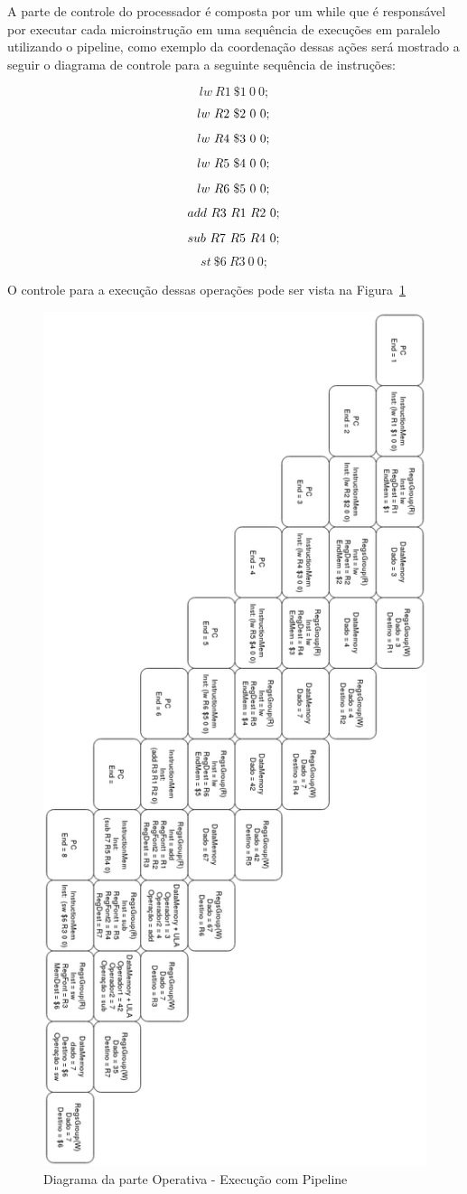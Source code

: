 \documentclass[12pt]{article}
\begin{document}
A parte de controle do processador é composta por um while que é responsável por executar cada microinstrução em uma sequência de execuções em paralelo utilizando o pipeline, como exemplo da coordenação dessas ações será mostrado a seguir o diagrama de controle para a seguinte sequência de instruções:

$$
lw \ R1 \ \$1 \ 0 \ 0; $$$$
lw \ R2 \ \$2 \ 0 \ 0; \\$$$$
lw \ R4 \ \$3 \ 0 \ 0; \\$$$$
lw \ R5 \ \$4 \ 0 \ 0; \\$$$$
lw \ R6 \ \$5 \ 0 \ 0; \\$$$$
add \ R3 \ R1 \ R2 \ 0; \\$$$$
sub \ R7 \ R5 \ R4 \ 0; \\$$$$
st \ \$6 \ R3 \ 0 \ 0;$$
$$$$

O controle para a execução dessas operações pode ser vista na Figura~\ref{fig:operativa}

\begin{figure}[h]
\centering
\includegraphics[width=.7\textwidth]{img/diagramaControle.png}
\caption{Diagrama da parte Operativa - Execução com Pipeline}
\label{fig:operativa}
\end{figure}
\end{document}
